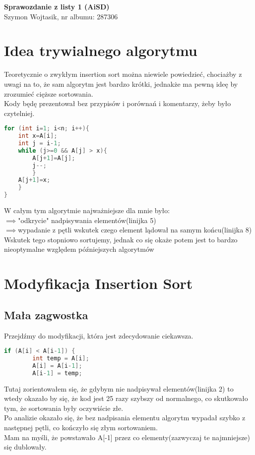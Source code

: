 \documentclass[12pt,a4paper]{article}
\begin{document}
\begin{center}
    {\LARGE \textbf{Sprawozdanie z listy 1 (AiSD)}}\\[0.2em]
    {\normalsize Szymon Wojtasik, nr albumu: 287306}
\end{center}

\vspace{-1em}

\section{Idea trywialnego algorytmu}
Teoretycznie o zwykłym insertion sort można niewiele powiedzieć, chociażby z uwagi na to, że sam algorytm jest bardzo krótki, jednakże ma pewną ideę by zrozumieć cięższe sortowania.\\ Kody będę prezentował bez przypisów i porównań i komentarzy, żeby było czytelniej.\\

\begin{lstlisting}[language=C++]
for (int i=1; i<n; i++){ 
    int x=A[i]; 
    int j = i-1;
    while (j>=0 && A[j] > x){ 
        A[j+1]=A[j];             
        j--; 
        }       
    A[j+1]=x; 
    }
}
\end{lstlisting}
 W całym tym algorytmie najważniejsze dla mnie było:\\
 $\implies$"odkrycie"  nadpisywania elementów(linijka 5)\\
 $\implies$wypadanie z pętli wskutek czego element lądował na samym końcu(linijka 8)\\ 
 Wskutek tego stopniowo sortujemy, jednak co się okaże potem jest to bardzo nieoptymalne względem późniejszych algorytmów\\


\section{Modyfikacja Insertion Sort}
\subsection{Mała zagwostka}
Przejdźmy do modyfikacji, która jest zdecydowanie ciekawsza.
\begin{lstlisting}[language=C++]        
    if (A[i] < A[i-1]) { 
        int temp = A[i]; 
        A[i] = A[i-1]; 
        A[i-1] = temp; 
\end{lstlisting}
Tutaj zorientowałem się, że gdybym nie nadpisywał elementów(linijka 2) to wtedy okazało by się, że kod jest 25 razy szybszy od normalnego, co skutkowało tym, że sortowania były oczywiście złe.\\
Po analizie okazało się, że bez nadpisania elementu algorytm wypadał szybko z następnej pętli, co kończyło się złym sortowaniem.\\
Mam na myśli, że powstawało A[-1] przez co elementy(zazwyczaj te najmniejsze) się dublowały.\\
\end{document}
